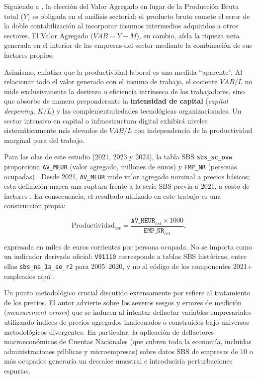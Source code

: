 \documentclass[12pt,a4paper]{article}
\begin{document}
Siguiendo a \citet[Cap.~2]{berndt1991practice}, la elección del Valor Agregado en lugar de la Producción Bruta total ($Y$) es obligada en el análisis sectorial: el producto bruto comete el error de la doble contabilización al incorporar insumos intermedios adquiridos a otros sectores. El Valor Agregado ($VAB = Y - M$), en cambio, aísla la riqueza neta generada en el interior de las empresas del sector mediante la combinación de sus factores propios.

Asimismo, \citet{berndt1991practice} enfatiza que la productividad laboral es una medida ``aparente''. Al relacionar todo el valor generado con el insumo de trabajo, el cociente $VAB/L$ no mide exclusivamente la destreza o eficiencia intrínseca de los trabajadores, sino que absorbe de manera preponderante la \textbf{intensidad de capital} (\textit{capital deepening}, $K/L$) y las complementariedades tecnológicas organizacionales. Un sector intensivo en capital o infraestructura digital exhibirá niveles sistemáticamente más elevados de $VAB/L$ con independencia de la productividad marginal pura del trabajo.

Para las olas de este estudio (2021, 2023 y 2024), la tabla SBS \texttt{sbs\_sc\_ovw} proporciona \texttt{AV\_MEUR} (valor agregado, millones de euros) y \texttt{EMP\_NR} (personas ocupadas) \citep{eurostat_sbs,eurostat_sbs_variables}. Desde 2021, \texttt{AV\_MEUR} mide valor agregado nominal a precios básicos; esta definición marca una ruptura frente a la serie SBS previa a 2021, a costo de factores \citep{eurostat_sbs_metadata,eurostat_ict_sector_metadata}. En consecuencia, el resultado utilizado en este trabajo es una construcción propia:

\begin{equation}
  \text{Productividad}_{cst} = \frac{\texttt{AV\_MEUR}_{cst}\times 1000}{\texttt{EMP\_NR}_{cst}},
\end{equation}

expresada en miles de euros corrientes por persona ocupada. No se importa como un indicador derivado oficial: \texttt{V91110} corresponde a tablas SBS históricas, entre ellas \texttt{sbs\_na\_1a\_se\_r2} para 2005--2020, y no al código de los componentes 2021+ empleados aquí \citep{eurostat_sbs_historical}.

Un punto metodológico crucial discutido extensamente por \citet[Caps.~2 y 9]{berndt1991practice} refiere al tratamiento de los precios. El autor advierte sobre los severos sesgos y errores de medición (\textit{measurement errors}) que se inducen al intentar deflactar variables empresariales utilizando índices de precios agregados inadecuados o construidos bajo universos metodológicos divergentes. En particular, la aplicación de deflactores macroeconómicos de Cuentas Nacionales (que cubren toda la economía, incluidas administraciones públicas y microempresas) sobre datos SBS de empresas de 10 o más ocupados generaría un descalce muestral e introduciría perturbaciones espurias.
\end{document}
